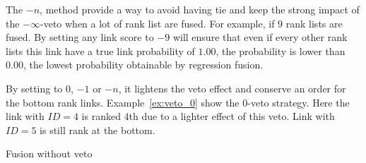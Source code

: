 The $-n$, method provide a way to avoid having tie and keep the strong impact of the $-\infty$-veto when a lot of rank list are fused.
For example, if $9$ rank lists are fused.
By setting any link score to $-9$ will ensure that even if every other rank lists this link have a true link probability of $1.00$, the probability is lower than $0.00$, the lowest probability obtainable by regression fusion.

By setting to $0$, $-1$ or $-n$, it lightens the veto effect and conserve an order for the bottom rank links.
Example~\ref{ex:veto_0} show the $0$-veto strategy.
Here the link with $ID = 4$ is ranked $4$th due to a lighter effect of this veto.
Link with $ID = 5$ is still rank at the bottom.

\begin{example}
  \centering
  \caption{Fusion without veto}
  \label{ex:noveto}

  \begin{subexample}{\linewidth}
    \centering
  \end{subexample}

  \vspace{0.5cm}

  \begin{subexample}{\linewidth}
    \centering
  \end{subexample}
\end{example}

